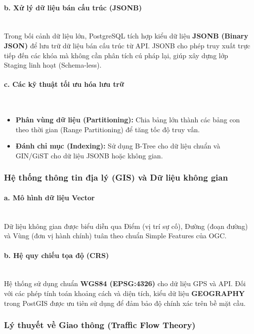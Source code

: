 \paragraph{b. Xử lý dữ liệu bán cấu trúc (JSONB)} \mbox{} \\
Trong bối cảnh dữ liệu lớn, PostgreSQL tích hợp kiểu dữ liệu \textbf{JSONB (Binary JSON)} để lưu trữ dữ liệu bán cấu trúc từ API. JSONB cho phép truy xuất trực tiếp đến các khóa mà không cần phân tích cú pháp lại, giúp xây dựng lớp Staging linh hoạt (Schema-less).

\paragraph{c. Các kỹ thuật tối ưu hóa lưu trữ} \mbox{} \\
\begin{itemize}
    \item \textbf{Phân vùng dữ liệu (Partitioning):} Chia bảng lớn thành các bảng con theo thời gian (Range Partitioning) để tăng tốc độ truy vấn.
    \item \textbf{Đánh chỉ mục (Indexing):} Sử dụng B-Tree cho dữ liệu chuẩn và GIN/GiST cho dữ liệu JSONB hoặc không gian.
\end{itemize}

\subsubsection{Hệ thống thông tin địa lý (GIS) và Dữ liệu không gian}

\paragraph{a. Mô hình dữ liệu Vector} \mbox{} \\
Dữ liệu không gian được biểu diễn qua Điểm (vị trí sự cố), Đường (đoạn đường) và Vùng (đơn vị hành chính) tuân theo chuẩn Simple Features của OGC.

\paragraph{b. Hệ quy chiếu tọa độ (CRS)} \mbox{} \\
Hệ thống sử dụng chuẩn \textbf{WGS84 (EPSG:4326)} cho dữ liệu GPS và API. Đối với các phép tính toán khoảng cách và diện tích, kiểu dữ liệu \textbf{GEOGRAPHY} trong PostGIS được ưu tiên sử dụng để đảm bảo độ chính xác trên bề mặt cầu.

\subsubsection{Lý thuyết về Giao thông (Traffic Flow Theory)}

